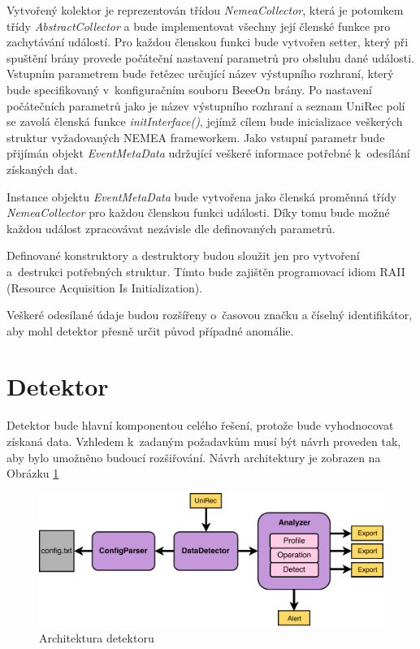  Vytvořený kolektor je reprezentován třídou \textit{NemeaCollector}, která je potomkem třídy
 \textit{AbstractCollector} a bude implementovat všechny její členské funkce pro zachytávání událostí. Pro každou 
 členskou funkci  bude vytvořen setter, který při spuštění brány provede počáteční nastavení
 parametrů pro obsluhu dané 
 události. Vstupním parametrem bude řetězec určující název výstupního rozhraní, který bude
 specifikovaný
v~konfiguračním souboru BeeeOn brány. Po nastavení počátečních parametrů jako je název výstupního
 rozhraní a seznam UniRec polí se zavolá členská funkce \textit{initInterface()}, jejímž cílem bude inicializace
 veškerých struktur vyžadovaných NEMEA frameworkem.
 Jako vstupní parametr bude přijímán objekt \textit{EventMetaData} udržující veškeré informace potřebné 
 k~odesílání získaných dat.
 
 Instance objektu \textit{EventMetaData} bude vytvořena jako členská proměnná třídy \textit{NemeaCollector}
 pro každou členskou funkci události. Díky tomu bude možné každou událost zpracovávat nezávisle dle
 definovaných parametrů.
 
 Definované konstruktory a destruktory budou sloužit jen pro vytvoření a~destrukci potřebných 
 struktur. Tímto bude zajištěn programovací idiom RAII (Resource Acquisition Is Initialization).
 
 Veškeré odesílané údaje budou rozšířeny o~časovou značku a číselný identifikátor, aby mohl detektor
 přesně určit původ případné anomálie.
 
 \newpage
 \section{Detektor}
 Detektor bude hlavní komponentou celého řešení, protože bude vyhodnocovat získaná data. Vzhledem
 k~zadaným požadavkům musí být návrh proveden tak, aby bylo umožněno budoucí rozšiřování. Návrh 
 architektury je zobrazen na Obrázku \ref{obr.detektor}
 \begin{figure}[ht]
   \begin{center}
   \includegraphics[scale=0.6]{pictures/detektor-arch}
   \caption{Architektura detektoru}
   \label{obr.detektor}
   \end{center}
   \end{figure}

